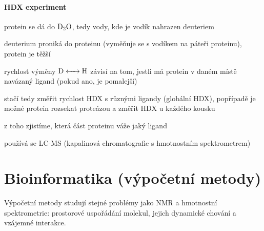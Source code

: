 \documentclass[DIV=8]{scrreprt}
\begin{document}
\paragraph{HDX experiment}
\begin{myItemize}[nosep]
    \item protein se dá do \(\ce{D2O}\), tedy vody, kde je vodík nahrazen deuteriem
    \item deuterium proniká do proteinu (vyměňuje se s vodíkem na páteři proteinu), protein je těžší
    \item rychlost výměny \(\ce{D <-> H}\) závisí na tom, jestli má protein v daném místě navázaný ligand (pokud ano, je pomalejší)
    \item stačí tedy změřit rychlost HDX s různými ligandy (globální HDX), popřípadě je možné protein rozsekat proteázou a změřit HDX u každého kousku
\begin{myItemize}[nosep]
    \item z toho zjistíme, která část proteinu váže jaký ligand
    \item používá se LC-MS (kapalinová chromatografie s hmotnostním spektrometrem)
\end{myItemize}

\end{myItemize}



\section{Bioinformatika (výpočetní metody)} \label{Bioinformatika (výpočetní metody)} \FloatBarrier


Výpočetní metody studují stejné problémy jako NMR a hmotnostní spektrometrie: prostorové uspořádání molekul, jejich dynamické chování a vzájemné interakce.

\end{document}
